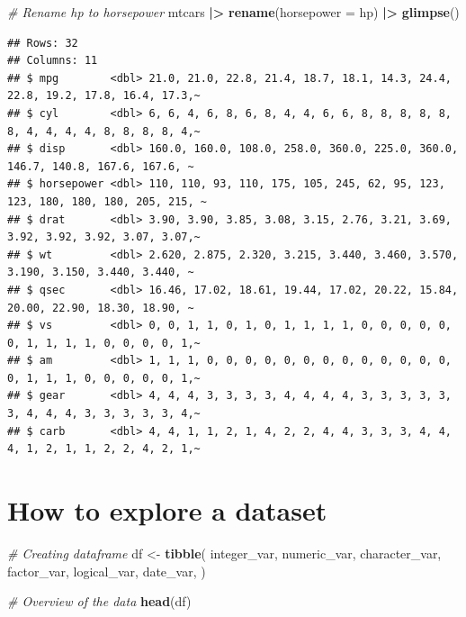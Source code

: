 \documentclass[
  12pt,
  oneside]{book}
\newenvironment{Shaded}{\begin{snugshade}}{\end{snugshade}}
\newcommand{\AttributeTok}[1]{\textcolor[rgb]{0.13,0.29,0.53}{#1}}
\newcommand{\CommentTok}[1]{\textcolor[rgb]{0.56,0.35,0.01}{\textit{#1}}}
\newcommand{\FunctionTok}[1]{\textcolor[rgb]{0.13,0.29,0.53}{\textbf{#1}}}
\newcommand{\NormalTok}[1]{#1}
\newcommand{\OtherTok}[1]{\textcolor[rgb]{0.56,0.35,0.01}{#1}}
\newcommand{\SpecialCharTok}[1]{\textcolor[rgb]{0.81,0.36,0.00}{\textbf{#1}}}
\theoremstyle{definition}
\theoremstyle{definition}
\theoremstyle{definition}
\theoremstyle{definition}
\theoremstyle{remark}
\begin{document}
\begin{Shaded}
\begin{Highlighting}[]
\CommentTok{\# Rename hp to horsepower}
\NormalTok{mtcars }\SpecialCharTok{|\textgreater{}} 
  \FunctionTok{rename}\NormalTok{(}\AttributeTok{horsepower =}\NormalTok{ hp) }\SpecialCharTok{|\textgreater{}} 
  \FunctionTok{glimpse}\NormalTok{()}
\end{Highlighting}
\end{Shaded}

\begin{verbatim}
## Rows: 32
## Columns: 11
## $ mpg        <dbl> 21.0, 21.0, 22.8, 21.4, 18.7, 18.1, 14.3, 24.4, 22.8, 19.2, 17.8, 16.4, 17.3,~
## $ cyl        <dbl> 6, 6, 4, 6, 8, 6, 8, 4, 4, 6, 6, 8, 8, 8, 8, 8, 8, 4, 4, 4, 4, 8, 8, 8, 8, 4,~
## $ disp       <dbl> 160.0, 160.0, 108.0, 258.0, 360.0, 225.0, 360.0, 146.7, 140.8, 167.6, 167.6, ~
## $ horsepower <dbl> 110, 110, 93, 110, 175, 105, 245, 62, 95, 123, 123, 180, 180, 180, 205, 215, ~
## $ drat       <dbl> 3.90, 3.90, 3.85, 3.08, 3.15, 2.76, 3.21, 3.69, 3.92, 3.92, 3.92, 3.07, 3.07,~
## $ wt         <dbl> 2.620, 2.875, 2.320, 3.215, 3.440, 3.460, 3.570, 3.190, 3.150, 3.440, 3.440, ~
## $ qsec       <dbl> 16.46, 17.02, 18.61, 19.44, 17.02, 20.22, 15.84, 20.00, 22.90, 18.30, 18.90, ~
## $ vs         <dbl> 0, 0, 1, 1, 0, 1, 0, 1, 1, 1, 1, 0, 0, 0, 0, 0, 0, 1, 1, 1, 1, 0, 0, 0, 0, 1,~
## $ am         <dbl> 1, 1, 1, 0, 0, 0, 0, 0, 0, 0, 0, 0, 0, 0, 0, 0, 0, 1, 1, 1, 0, 0, 0, 0, 0, 1,~
## $ gear       <dbl> 4, 4, 4, 3, 3, 3, 3, 4, 4, 4, 4, 3, 3, 3, 3, 3, 3, 4, 4, 4, 3, 3, 3, 3, 3, 4,~
## $ carb       <dbl> 4, 4, 1, 1, 2, 1, 4, 2, 2, 4, 4, 3, 3, 3, 4, 4, 4, 1, 2, 1, 1, 2, 2, 4, 2, 1,~
\end{verbatim}

\hypertarget{how-to-explore-a-dataset}{%
\section{How to explore a dataset}\label{how-to-explore-a-dataset}}

\begin{Shaded}
\begin{Highlighting}[]
\CommentTok{\# Creating dataframe}
\NormalTok{df }\OtherTok{\textless{}{-}} \FunctionTok{tibble}\NormalTok{(}
\NormalTok{  integer\_var, numeric\_var, character\_var, factor\_var, logical\_var, date\_var,}
\NormalTok{)}

\CommentTok{\# Overview of the data}
\FunctionTok{head}\NormalTok{(df)}
\end{Highlighting}
\end{Shaded}
\end{document}
